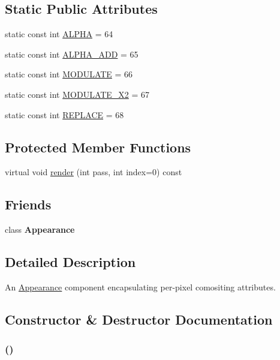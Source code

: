 \subsection*{Static Public Attributes}
\begin{CompactItemize}
\item 
static const int \hyperlink{classm3g_1_1CompositingMode_417581fcde4067111f47320edb2aa378}{ALPHA} = 64
\item 
static const int \hyperlink{classm3g_1_1CompositingMode_91ac80a5450e5f7f7e382860829030d9}{ALPHA\_\-ADD} = 65
\item 
static const int \hyperlink{classm3g_1_1CompositingMode_96b64c2847348fb73a90c4a501cda9d1}{MODULATE} = 66
\item 
static const int \hyperlink{classm3g_1_1CompositingMode_cb426684e42a5ae425989c65fbb7dbc4}{MODULATE\_\-X2} = 67
\item 
static const int \hyperlink{classm3g_1_1CompositingMode_47a00ac5a59817a48db06fb2a538883c}{REPLACE} = 68
\end{CompactItemize}
\subsection*{Protected Member Functions}
\begin{CompactItemize}
\item 
virtual void \hyperlink{classm3g_1_1CompositingMode_1efcb1973989d9963d5bd6d03065d389}{render} (int pass, int index=0) const 
\end{CompactItemize}
\subsection*{Friends}
\begin{CompactItemize}
\item 
\hypertarget{classm3g_1_1CompositingMode_afa5201a494f65c37039281d9b63a2a9}{
class \textbf{Appearance}}
\label{classm3g_1_1CompositingMode_afa5201a494f65c37039281d9b63a2a9}

\end{CompactItemize}


\subsection{Detailed Description}
An \hyperlink{classm3g_1_1Appearance}{Appearance} component encapsulating per-pixel comositing attributes. 

\subsection{Constructor \& Destructor Documentation}
\hypertarget{classm3g_1_1CompositingMode_5abfd1a798f1327aac4b92f55d4ecc0c}{
\subsubsection[{CompositingMode}]{ ()}}
\label{classm3g_1_1CompositingMode_5abfd1a798f1327aac4b92f55d4ecc0c}


